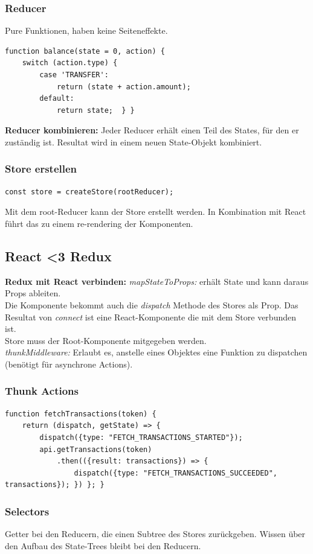 \subsubsection{Reducer}
Pure Funktionen, haben keine Seiteneffekte.
\begin{lstlisting}
function balance(state = 0, action) {
    switch (action.type) {
        case 'TRANSFER':
            return (state + action.amount);
        default:
            return state;  } }
\end{lstlisting}
\textbf{Reducer kombinieren:} Jeder Reducer erhält einen Teil des States, für den er zuständig ist.
Resultat wird in einem neuen State-Objekt kombiniert.

\subsubsection{Store erstellen}
\begin{lstlisting}
const store = createStore(rootReducer);
\end{lstlisting}
Mit dem root-Reducer kann der Store erstellt werden.
In Kombination mit React führt das zu einem re-rendering der Komponenten.

\subsection{React \textless 3 Redux}
\textbf{Redux mit React verbinden:}
\textit{mapStateToProps:} erhält State und kann daraus Props ableiten.\\
Die Komponente bekommt auch die \textit{dispatch} Methode des Stores als Prop.
Das Resultat von \textit{connect} ist eine React-Komponente die mit dem Store verbunden ist.\\
Store muss der Root-Komponente mitgegeben werden.\\
\textit{thunkMiddleware:} Erlaubt es, anstelle eines Objektes eine Funktion zu dispatchen (benötigt für asynchrone Actions).

\subsubsection{Thunk Actions}
\begin{lstlisting}
function fetchTransactions(token) {
    return (dispatch, getState) => {
        dispatch({type: "FETCH_TRANSACTIONS_STARTED"});
        api.getTransactions(token)
            .then(({result: transactions}) => {
                dispatch({type: "FETCH_TRANSACTIONS_SUCCEEDED", transactions}); }) }; }
\end{lstlisting}

\subsubsection{Selectors}
Getter bei den Reducern, die einen Subtree des Stores zurückgeben.
Wissen über den Aufbau des State-Trees bleibt bei den Reducern.